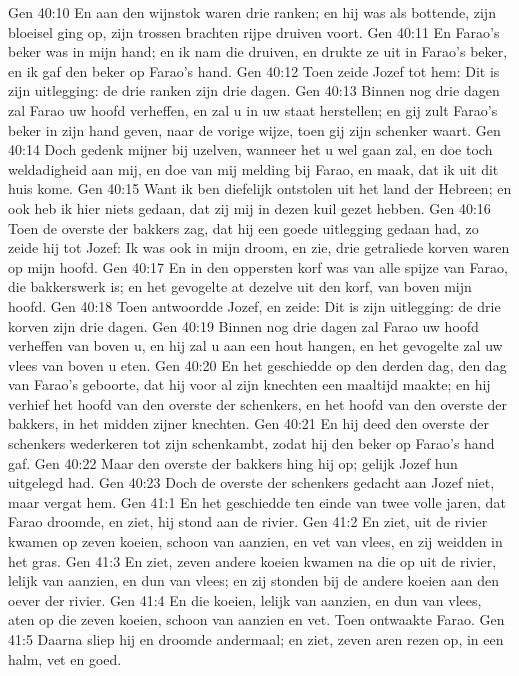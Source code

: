 Gen 40:10  En aan den wijnstok waren drie ranken; en hij was als bottende, zijn bloeisel ging op, zijn trossen brachten rijpe druiven voort.
Gen 40:11  En Farao's beker was in mijn hand; en ik nam die druiven, en drukte ze uit in Farao's beker, en ik gaf den beker op Farao's hand.
Gen 40:12  Toen zeide Jozef tot hem: Dit is zijn uitlegging: de drie ranken zijn drie dagen.
Gen 40:13  Binnen nog drie dagen zal Farao uw hoofd verheffen, en zal u in uw staat herstellen; en gij zult Farao's beker in zijn hand geven, naar de vorige wijze, toen gij zijn schenker waart.
Gen 40:14  Doch gedenk mijner bij uzelven, wanneer het u wel gaan zal, en doe toch weldadigheid aan mij, en doe van mij melding bij Farao, en maak, dat ik uit dit huis kome.
Gen 40:15  Want ik ben diefelijk ontstolen uit het land der Hebreen; en ook heb ik hier niets gedaan, dat zij mij in dezen kuil gezet hebben.
Gen 40:16  Toen de overste der bakkers zag, dat hij een goede uitlegging gedaan had, zo zeide hij tot Jozef: Ik was ook in mijn droom, en zie, drie getraliede korven waren op mijn hoofd.
Gen 40:17  En in den oppersten korf was van alle spijze van Farao, die bakkerswerk is; en het gevogelte at dezelve uit den korf, van boven mijn hoofd.
Gen 40:18  Toen antwoordde Jozef, en zeide: Dit is zijn uitlegging: de drie korven zijn drie dagen.
Gen 40:19  Binnen nog drie dagen zal Farao uw hoofd verheffen van boven u, en hij zal u aan een hout hangen, en het gevogelte zal uw vlees van boven u eten.
Gen 40:20  En het geschiedde op den derden dag, den dag van Farao's geboorte, dat hij voor al zijn knechten een maaltijd maakte; en hij verhief het hoofd van den overste der schenkers, en het hoofd van den overste der bakkers, in het midden zijner knechten.
Gen 40:21  En hij deed den overste der schenkers wederkeren tot zijn schenkambt, zodat hij den beker op Farao's hand gaf.
Gen 40:22  Maar den overste der bakkers hing hij op; gelijk Jozef hun uitgelegd had.
Gen 40:23  Doch de overste der schenkers gedacht aan Jozef niet, maar vergat hem.
Gen 41:1  En het geschiedde ten einde van twee volle jaren, dat Farao droomde, en ziet, hij stond aan de rivier.
Gen 41:2  En ziet, uit de rivier kwamen op zeven koeien, schoon van aanzien, en vet van vlees, en zij weidden in het gras.
Gen 41:3  En ziet, zeven andere koeien kwamen na die op uit de rivier, lelijk van aanzien, en dun van vlees; en zij stonden bij de andere koeien aan den oever der rivier.
Gen 41:4  En die koeien, lelijk van aanzien, en dun van vlees, aten op die zeven koeien, schoon van aanzien en vet. Toen ontwaakte Farao.
Gen 41:5  Daarna sliep hij en droomde andermaal; en ziet, zeven aren rezen op, in een halm, vet en goed.
